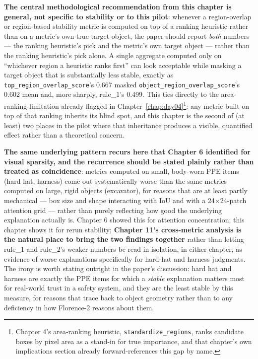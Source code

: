 \textbf{The central methodological recommendation from this chapter is general, not specific to
stability or to this pilot}: whenever a region-overlap or region-based stability metric is computed
on top of a ranking heuristic rather than on a metric's own true target object, the paper should
report \emph{both} numbers --- the ranking heuristic's pick and the metric's own target object ---
rather than the ranking heuristic's pick alone. A single aggregate computed only on ``whichever
region a heuristic ranks first'' can look acceptable while masking a target object that is
substantially less stable, exactly as \texttt{top\_region\_overlap\_score}'s 0.667 masked
\texttt{object\_region\_overlap\_score}'s 0.602 mean and, more sharply, rule\_1's 0.499. This ties
directly to the area-ranking limitation already flagged in
Chapter~\ref{chap:day04}\footnote{Chapter 4's area-ranking heuristic, \texttt{standardize\_regions},
ranks candidate boxes by pixel area as a stand-in for true importance, and that chapter's own
implications section already forward-references this gap by name.}: any metric built on top of
that ranking inherits its blind spot, and this chapter is the second of (at least) two places in
the pilot where that inheritance produces a visible, quantified effect rather than a theoretical
concern.

\textbf{The same underlying pattern recurs here that Chapter 6 identified for visual sparsity, and
the recurrence should be stated plainly rather than treated as coincidence}: metrics computed on
small, body-worn PPE items (hard hat, harness) come out systematically worse than the same metrics
computed on large, rigid objects (excavator), for reasons that are at least partly mechanical ---
box size and shape interacting with IoU and with a 24$\times$24-patch attention grid --- rather than
purely reflecting how good the underlying explanation actually is. Chapter 6 showed this for
attention concentration; this chapter shows it for rerun stability; \textbf{Chapter 11's
cross-metric analysis is the natural place to bring the two findings together} rather than letting
rule\_1 and rule\_2's weaker numbers be read in isolation, in either chapter, as evidence of worse
explanations specifically for hard-hat and harness judgments. The irony is worth stating outright in
the paper's discussion: hard hat and harness are exactly the PPE items for which a \emph{stable}
explanation matters most for real-world trust in a safety system, and they are the least stable by
this measure, for reasons that trace back to object geometry rather than to any deficiency in how
Florence-2 reasons about them.
